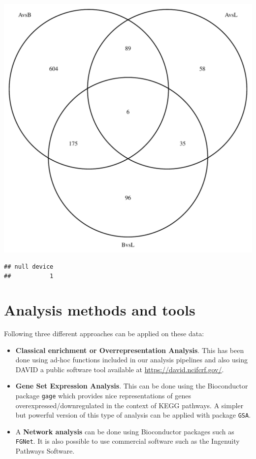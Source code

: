 \documentclass{article}\usepackage[]{graphicx}\usepackage[]{color}
\makeatletter
\def\maxwidth{ %
  \ifdim\Gin@nat@width>\linewidth
    \linewidth
  \else
    \Gin@nat@width
  \fi
}
\newenvironment{kframe}{%
 \def\at@end@of@kframe{}%
 \ifinner\ifhmode%
  \def\at@end@of@kframe{\end{minipage}}%
  \begin{minipage}{\columnwidth}%
 \fi\fi%
 \def\FrameCommand##1{\hskip\@totalleftmargin \hskip-\fboxsep
 \colorbox{shadecolor}{##1}\hskip-\fboxsep
     \hskip-\linewidth \hskip-\@totalleftmargin \hskip\columnwidth}%
 \MakeFramed {\advance\hsize-\width
   \@totalleftmargin\z@ \linewidth\hsize
   \@setminipage}}%
 {\par\unskip\endMakeFramed%
 \at@end@of@kframe}
\newenvironment{knitrout}{}{} %
\makeatother
\begin{document}
\begin{knitrout}
\color{fgcolor}
\includegraphics[width=\maxwidth]{images/graficvennSigGenes2-1} 
\begin{kframe}\begin{verbatim}
## null device 
##           1
\end{verbatim}
\end{kframe}
\end{knitrout}

\section{Analysis methods and tools}

Following \cite{Khatri:2012} three different approaches can be applied on these data:
\begin{itemize}
  \item \textbf{Classical enrichment or Overrepresentation Analysis}. This has been done using ad-hoc functions included in our analysis pipelines and also using DAVID a public software tool available at \url{https://david.ncifcrf.gov/}.
  \item \textbf{Gene Set Expression Analysis}. This can be done using the Bioconductor package \texttt{gage} which provides nice representations of genes overexpressed/downregulated in the context of KEGG pathways. A simpler but powerful version of this type of analysis can be applied with package \texttt{GSA}.
  \item A \textbf{Network analysis} can be done using Bioconductor packages such as \texttt{FGNet}. It is also possible to use commercial software such as the Ingenuity Pathways Software.
\end{itemize}
\end{document}
